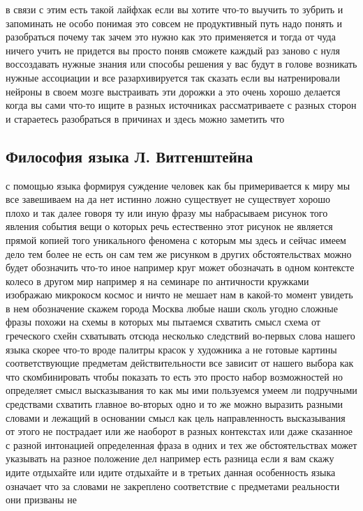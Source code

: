 в связи с этим есть такой лайфхак если вы хотите что-то выучить то зубрить и
запоминать не особо понимая это совсем не продуктивный путь надо понять и
разобраться почему так зачем это нужно как это применяется и тогда от чуда
ничего учить не придется вы просто поняв сможете каждый раз заново с нуля
воссоздавать нужные знания или способы решения у вас будут в голове возникать
нужные ассоциации и все разархивируется так сказать если вы натренировали
нейроны в своем мозге выстраивать эти дорожки а это очень хорошо делается когда
вы сами что-то ищите в разных источниках рассматриваете с разных сторон и
стараетесь разобраться в причинах и здесь можно заметить что 

\subsection{Философия языка Л. Витгенштейна}
с помощью языка
формируя суждение человек как бы примеривается к миру мы все завешиваем на да
нет истинно ложно существует не существует хорошо плохо и так далее говоря ту
или иную фразу мы набрасываем рисунок того явления события вещи о которых речь
естественно этот рисунок не является прямой копией того уникального феномена с
которым мы здесь и сейчас имеем дело тем более не есть он сам тем же рисунком в
других обстоятельствах можно будет обозначить что-то иное например круг может
обозначать в одном контексте колесо в другом мир например я на семинаре по
античности кружками изображаю микрокосм космос и ничто не мешает нам в какой-то
момент увидеть в нем обозначение скажем города Москва любые наши сколь угодно
сложные фразы похожи на схемы в которых мы пытаемся схватить смысл схема от
греческого схейн схватывать отсюда несколько следствий во-первых слова нашего
языка скорее что-то вроде палитры красок у художника а не готовые картины
соответствующие предметам действительности все зависит от нашего выбора как что
скомбинировать чтобы показать то есть это просто набор возможностей но
определяет смысл высказывания то как мы ими пользуемся умеем ли подручными
средствами схватить главное во-вторых одно и то же можно выразить разными
словами и лежащий в основании смысл как цель направленность высказывания от
этого не пострадает или же наоборот в разных контекстах или даже сказанное с
разной интонацией определенная фраза в одних и тех же обстоятельствах может
указывать на разное положение дел например есть разница если я вам скажу идите
отдыхайте или идите отдыхайте и в третьих данная особенность языка означает что
за словами не закреплено соответствие с предметами реальности они призваны не
